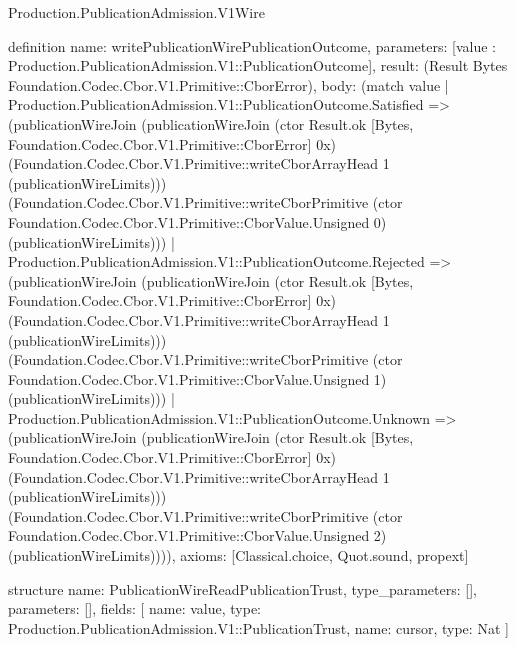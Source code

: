 \begin{lexlean}{Production.PublicationAdmission.V1Wire}
\begin{semanticmodule}
definition{
  name: writePublicationWirePublicationOutcome,
  parameters: [value : Production.PublicationAdmission.V1::PublicationOutcome],
  result: (Result Bytes Foundation.Codec.Cbor.V1.Primitive::CborError),
  body: (match value
    | Production.PublicationAdmission.V1::PublicationOutcome.Satisfied => (publicationWireJoin (publicationWireJoin (ctor Result.ok [Bytes, Foundation.Codec.Cbor.V1.Primitive::CborError] 0x) (Foundation.Codec.Cbor.V1.Primitive::writeCborArrayHead 1 (publicationWireLimits))) (Foundation.Codec.Cbor.V1.Primitive::writeCborPrimitive (ctor Foundation.Codec.Cbor.V1.Primitive::CborValue.Unsigned 0) (publicationWireLimits)))
    | Production.PublicationAdmission.V1::PublicationOutcome.Rejected => (publicationWireJoin (publicationWireJoin (ctor Result.ok [Bytes, Foundation.Codec.Cbor.V1.Primitive::CborError] 0x) (Foundation.Codec.Cbor.V1.Primitive::writeCborArrayHead 1 (publicationWireLimits))) (Foundation.Codec.Cbor.V1.Primitive::writeCborPrimitive (ctor Foundation.Codec.Cbor.V1.Primitive::CborValue.Unsigned 1) (publicationWireLimits)))
    | Production.PublicationAdmission.V1::PublicationOutcome.Unknown => (publicationWireJoin (publicationWireJoin (ctor Result.ok [Bytes, Foundation.Codec.Cbor.V1.Primitive::CborError] 0x) (Foundation.Codec.Cbor.V1.Primitive::writeCborArrayHead 1 (publicationWireLimits))) (Foundation.Codec.Cbor.V1.Primitive::writeCborPrimitive (ctor Foundation.Codec.Cbor.V1.Primitive::CborValue.Unsigned 2) (publicationWireLimits)))),
  axioms: [Classical.choice, Quot.sound, propext]
}

structure{
  name: PublicationWireReadPublicationTrust,
  type_parameters: [],
  parameters: [],
  fields: [
    {name: value, type: Production.PublicationAdmission.V1::PublicationTrust},
    {name: cursor, type: Nat}
  ]
}


\end{semanticmodule}
\end{lexlean}
